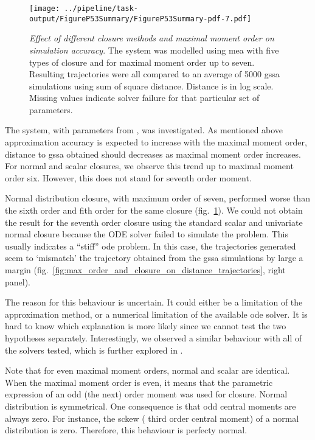 \begin{figure}[t]
    \centering
    \texttt{[image: ../pipeline/task-output/FigureP53Summary/FigureP53Summary-pdf-7.pdf]}
    \caption{\emph{Effect of different closure methods and maximal moment order on simulation accuracy}. The \pft{} system was modelled using \gls{mea} with five types of closure and for maximal moment order up to seven.
Resulting trajectories were all compared to an average of 5000 \gls{gssa} simulations using sum of square distance.
Distance is in log scale. Missing values indicate solver failure for that particular set of parameters.}
    \label{fig:max_order_and_closure_on_distance_summary}
\end{figure}

The \pft{} system, with parameters from \cite{ale_general_2013}, was investigated.
As mentioned above approximation accuracy is expected to increase with the maximal moment order, \ie{} distance to \gls{gssa} obtained should decreases
 as maximal moment order increases.
For normal and scalar closures, we observe this trend up to maximal moment order six.
However, this does not stand for seventh order moment.

Normal distribution closure, with maximum order of seven, performed worse than the sixth order and fith order for the same closure (fig.~\ref{fig:max_order_and_closure_on_distance_summary}).
We could not obtain the result for the seventh order closure using the standard scalar and univariate normal closure
because the ODE solver failed to simulate the problem.
This usually indicates a ``stiff'' \gls{ode} problem.
In this case, the trajectories generated seem to `mismatch' the trajectory obtained from the \gls{gssa} simulations by
large a margin (fig.~\ref{fig:max_order_and_closure_on_distance_trajectories}, right panel).

The reason for this behaviour is uncertain. It could either be a limitation of the approximation method, or a numerical limitation of the available \gls{ode} solver.
It is hard to know which explanation is more likely since we cannot test the two hypotheses separately.
Interestingly, we observed a similar behaviour with all of the solvers tested, which is further explored in .

Note that for even maximal moment orders, normal and scalar are identical.
When the maximal moment order is even, it means that the parametric expression of an odd (the next) order moment was used for closure.
Normal distribution is symmetrical. One consequence is that odd central moments are always zero.
For instance, the sckew (\ie{} third order central moment) of a normal distribution is zero.
Therefore, this behaviour is perfecty normal.


